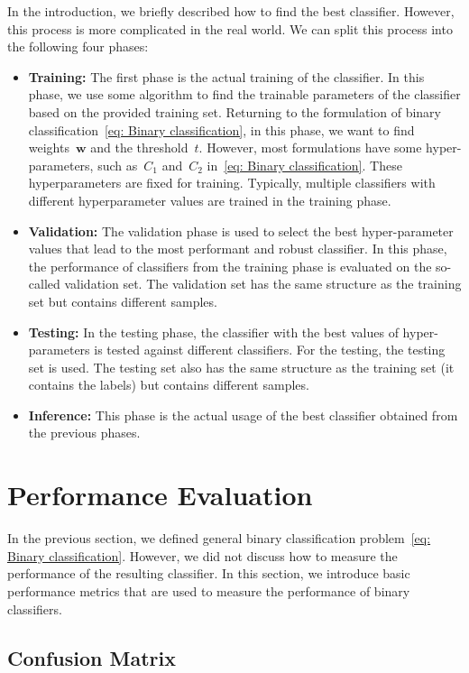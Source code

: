 In the introduction, we briefly described how to find the best classifier. However, this process is more complicated in the real world. We can split this process into the following four phases:
\begin{itemize}
  \item \textbf{Training:} The first phase is the actual training of the classifier. In this phase, we use some algorithm to find the trainable parameters of the classifier based on the provided training set. Returning to the formulation of binary classification~\ref{eq: Binary classification}, in this phase, we want to find weights~$\bm{w}$ and the threshold~$t.$ However, most formulations have some hyper-parameters, such as~$C_1$ and~$C_2$ in~\ref{eq: Binary classification}. These hyperparameters are fixed for training. Typically, multiple classifiers with different hyperparameter values are trained in the training phase.
  \item \textbf{Validation:} The validation phase is used to select the best hyper-parameter values that lead to the most performant and robust classifier. In this phase, the performance of classifiers from the training phase is evaluated on the so-called validation set. The validation set has the same structure as the training set but contains different samples. 
  \item \textbf{Testing:} In the testing phase, the classifier with the best values of hyper-parameters is tested against different classifiers. For the testing, the testing set is used. The testing set also has the same structure as the training set (it contains the labels) but contains different samples.
  \item \textbf{Inference:} This phase is the actual usage of the best classifier obtained from the previous phases.
\end{itemize}

\section{Performance Evaluation}\label{sec: performance evaluation}

In the previous section, we defined general binary classification problem~\eqref{eq: Binary classification}. However, we did not discuss how to measure the performance of the resulting classifier. In this section, we introduce basic performance metrics  that are used to measure the performance of binary classifiers.

\subsection{Confusion Matrix}

